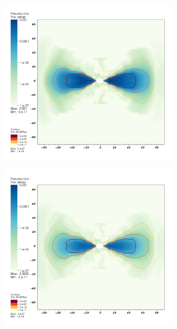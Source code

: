 \begin{figure}
  \centering
  \begin{subfigure}{.31\textwidth}
    \centering
    \includegraphics[width=1\linewidth]{Figures/zetae_meridional}
  \end{subfigure}
  \begin{subfigure}{.31\textwidth}
    \centering
    \includegraphics[width=1\linewidth]{Figures/zetaa_meridional}

\end{subfigure}
\end{figure}
